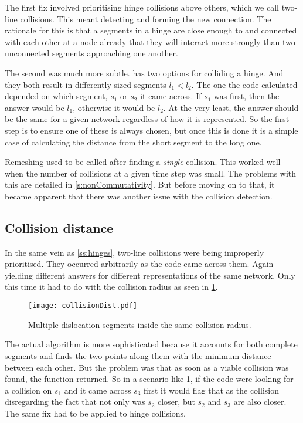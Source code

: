 The first fix involved prioritising hinge collisions above others, which we call two-line collisions. This meant detecting and forming the new connection. The rationale for this is that a segments in a hinge are close enough to and connected with each other at a node already that they will interact more strongly than two unconnected segments approaching one another.

The second was much more subtle.  has two options for colliding a hinge. And they both result in differently sized segments $l_1 < l_2$. The one the code calculated depended on which segment, $s_1$ or $s_2$ it came across. If $s_1$ was first, then the answer would be $l_1$, otherwise it would be $l_2$. At the very least, the answer should be the same for a given network regardless of how it is represented. So the first step is to ensure one of these is always chosen, but once this is done it is a simple case of calculating the distance from the short segment to the long one.

Remeshing used to be called after finding a \emph{single} collision. This worked well when the number of collisions at a given time step was small. The problems with this are detailed in \cref{s:nonCommutativity}. But before moving on to that, it became apparent that there was another issue with the collision detection.

\subsection{Collision distance}\label{ss:collisionDistance}

In the same vein as \cref{ss:hinges}, two-line collisions were being improperly prioritised. They occurred arbitrarily as the code came across them. Again yielding different answers for different representations of the same network. Only this time it had to do with the collision radius as seen in \cref{f:collisionRadius}.
\begin{figure}
    \centering
    \texttt{[image: collisionDist.pdf]}
    \caption[Dislocation segments inside different collision radii.]{Multiple dislocation segments inside the same collision radius.}
    \label{f:collisionRadius}
\end{figure}

The actual algorithm is more sophisticated because it accounts for both complete segments and finds the two points along them with the minimum distance between each other. But the problem was that as soon as a viable collision was found, the function returned. So in a scenario like \cref{f:collisionRadius}, if the code were looking for a collision on $s_1$ and it came across $s_3$ first it would flag that as the collision disregarding the fact that not only was $s_2$ closer, but $s_2$ and $s_3$ are also closer. The same fix had to be applied to hinge collisions.

